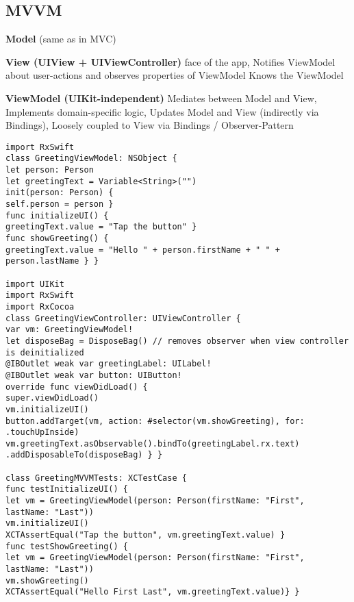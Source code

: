 \subsection{MVVM}
\textbf{Model} (same as in MVC)

\textbf{View (UIView + UIViewController)}
face of the app,
Notifies ViewModel about user-actions and observes properties of ViewModel
Knows the ViewModel

\textbf{ViewModel (UIKit-independent)}
Mediates between Model and View,
Implements domain-specific logic,
Updates Model and View (indirectly via Bindings),
Loosely coupled to View via Bindings / Observer-Pattern

\begin{lstlisting}
import RxSwift
class GreetingViewModel: NSObject {
let person: Person
let greetingText = Variable<String>("")
init(person: Person) {
self.person = person }
func initializeUI() {
greetingText.value = "Tap the button" }
func showGreeting() {
greetingText.value = "Hello " + person.firstName + " " + person.lastName } }

import UIKit
import RxSwift
import RxCocoa
class GreetingViewController: UIViewController {
var vm: GreetingViewModel!
let disposeBag = DisposeBag() // removes observer when view controller is deinitialized
@IBOutlet weak var greetingLabel: UILabel!
@IBOutlet weak var button: UIButton!
override func viewDidLoad() {
super.viewDidLoad()
vm.initializeUI()
button.addTarget(vm, action: #selector(vm.showGreeting), for: .touchUpInside)
vm.greetingText.asObservable().bindTo(greetingLabel.rx.text)
.addDisposableTo(disposeBag) } }

class GreetingMVVMTests: XCTestCase {
func testInitializeUI() {
let vm = GreetingViewModel(person: Person(firstName: "First", lastName: "Last"))
vm.initializeUI()
XCTAssertEqual("Tap the button", vm.greetingText.value) }
func testShowGreeting() {
let vm = GreetingViewModel(person: Person(firstName: "First", lastName: "Last"))
vm.showGreeting()
XCTAssertEqual("Hello First Last", vm.greetingText.value)} }
\end{lstlisting}



